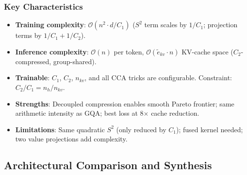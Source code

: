 \subsubsection{Key Characteristics}
\begin{itemize}[leftmargin=*]
    \item \textbf{Training complexity}: $\mathcal{O}(n^2 \cdot d / C_1)$ ($S^2$ term scales by $1/C_1$; projection terms by $1/C_1 + 1/C_2$).
    \item \textbf{Inference complexity}: $\mathcal{O}(n)$ per token, $\mathcal{O}(\tilde{e}_{kv} \cdot n)$ KV-cache space ($C_2$-compressed, group-shared).
    \item \textbf{Trainable}: $C_1$, $C_2$, $n_{kv}$, and all CCA tricks are configurable. Constraint: $C_2/C_1 = n_h/n_{kv}$.
    \item \textbf{Strengths}: Decoupled compression enables smooth Pareto frontier; same arithmetic intensity as GQA; best loss at 8$\times$ cache reduction.
    \item \textbf{Limitations}: Same quadratic $S^2$ (only reduced by $C_1$); fused kernel needed; two value projections add complexity.
\end{itemize}

\subsection{Architectural Comparison and Synthesis}

